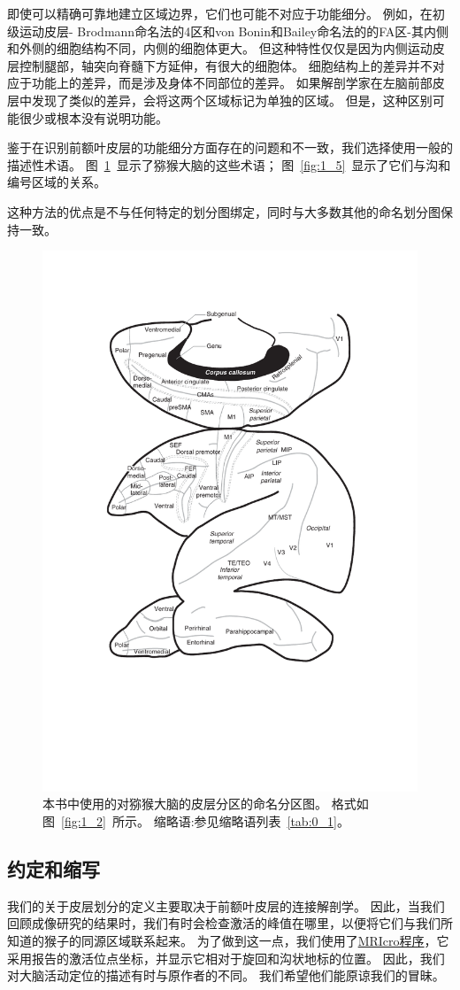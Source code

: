 \par
即使可以精确可靠地建立区域边界，它们也可能不对应于功能细分。
例如，在初级运动皮层- Brodmann命名法的4区和von Bonin和Bailey命名法的的FA区-其内侧和外侧的细胞结构不同，内侧的细胞体更大。
但这种特性仅仅是因为内侧运动皮层控制腿部，轴突向脊髓下方延伸，有很大的细胞体。
细胞结构上的差异并不对应于功能上的差异，而是涉及身体不同部位的差异。
如果解剖学家在左脑前部皮层中发现了类似的差异，会将这两个区域标记为单独的区域。
但是，这种区别可能很少或根本没有说明功能。

\par
鉴于在识别前额叶皮层的功能细分方面存在的问题和不一致，我们选择使用一般的描述性术语。
图~\ref{fig:1_4}~显示了猕猴大脑的这些术语；
图~\ref{fig:1_5}~显示了它们与沟和编号区域的关系。


这种方法的优点是不与任何特定的划分图绑定，同时与大多数其他的命名划分图保持一致。


\begin{figure}[!htb]
	\centering
	\includegraphics[width=0.6\linewidth]{chap1/1_4}
	\caption{本书中使用的对猕猴大脑的皮层分区的命名分区图。
		格式如图~\ref{fig:1_2}~所示。
		缩略语:参见缩略语列表~\ref{tab:0_1}。\label{fig:1_4}}
\end{figure}




\subsection{约定和缩写}
我们的关于皮层划分的定义主要取决于前额叶皮层的连接解剖学。
因此，当我们回顾成像研究的结果时，我们有时会检查激活的峰值在哪里，以便将它们与我们所知道的猴子的同源区域联系起来。
为了做到这一点，我们使用了\href{http://www.cabiatl.com/mricro/MRIcro/index.html}{MRIcro程序}，它采用报告的激活位点坐标，并显示它相对于旋回和沟状地标的位置。
因此，我们对大脑活动定位的描述有时与原作者的不同。
我们希望他们能原谅我们的冒昧。


